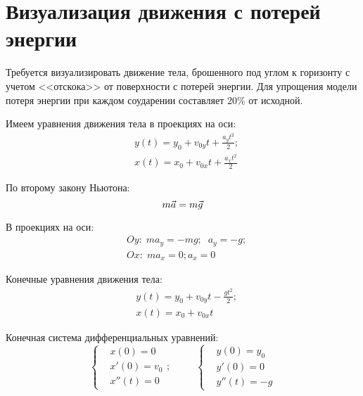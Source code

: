 \newpage
\section[Визуализация движения с потерей энергии]{Визуализация движения с потерей энергии}

Требуется визуализировать движение тела, брошенного под углом к горизонту с учетом <<отскока>>  от поверхности с потерей энергии.
Для упрощения модели потеря энергии при каждом соударении составляет 20\% от исходной.

Имеем уравнения движения тела в проекциях на оси:
\begin{equation*}
    \begin{aligned}
        &y(t) = y_{0} + v_{0y}t+\frac{a_{y}t^{2}}{2}; \\
        &x(t) = x_{0} + v_{0x}t+\frac{a_{x}t^{2}}{2}
    \end{aligned}
\end{equation*}

По второму закону Ньютона:
\begin{equation*}
    m\vec{a} = m\vec{g} \\
\end{equation*}

В проекциях на оси:
\begin{equation*}
    \begin{aligned}
        &Oy: \; ma_{y} = -mg; \;\; 
        a_{y} = -g; \\
        &Ox: \; ma_{x} = 0;
        a_{x} = 0
    \end{aligned}
\end{equation*}

Конечные уравнения движения тела:
\begin{equation*}
    \begin{aligned}
        &y(t) = y_{0} + v_{0y}t - \frac{gt^{2}}{2};\\
        &x(t) = x_{0} + v_{0x}t
    \end{aligned}
\end{equation*}

Конечная система дифференциальных уравнений:
\begin{equation*}
    \left\{
        \begin{aligned}
            &x(0) = 0 \\
            &x'(0) = v_{0} \\
            &x''(t) = 0
        \end{aligned}
    \right.; \;\;\;\;\;\;\;\;\;
    \left\{
        \begin{aligned}
            &y(0) = y_{0} \\
            &y'(0) = 0 \\
            &y''(t) = -g
        \end{aligned}
    \right. 
\end{equation*}

